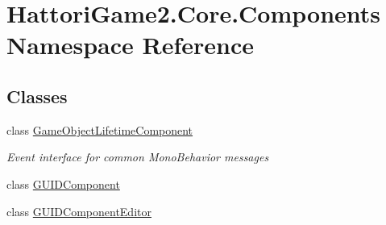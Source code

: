 \hypertarget{namespace_hattori_game2_1_1_core_1_1_components}{}\section{Hattori\+Game2.\+Core.\+Components Namespace Reference}
\label{namespace_hattori_game2_1_1_core_1_1_components}
\subsection*{Classes}
\begin{DoxyCompactItemize}
\item 
class \hyperlink{class_hattori_game2_1_1_core_1_1_components_1_1_game_object_lifetime_component}{Game\+Object\+Lifetime\+Component}
\begin{DoxyCompactList}\small\item\em Event interface for common Mono\+Behavior messages \end{DoxyCompactList}\item 
class \hyperlink{class_hattori_game2_1_1_core_1_1_components_1_1_g_u_i_d_component}{G\+U\+I\+D\+Component}
\item 
class \hyperlink{class_hattori_game2_1_1_core_1_1_components_1_1_g_u_i_d_component_editor}{G\+U\+I\+D\+Component\+Editor}
\end{DoxyCompactItemize}
